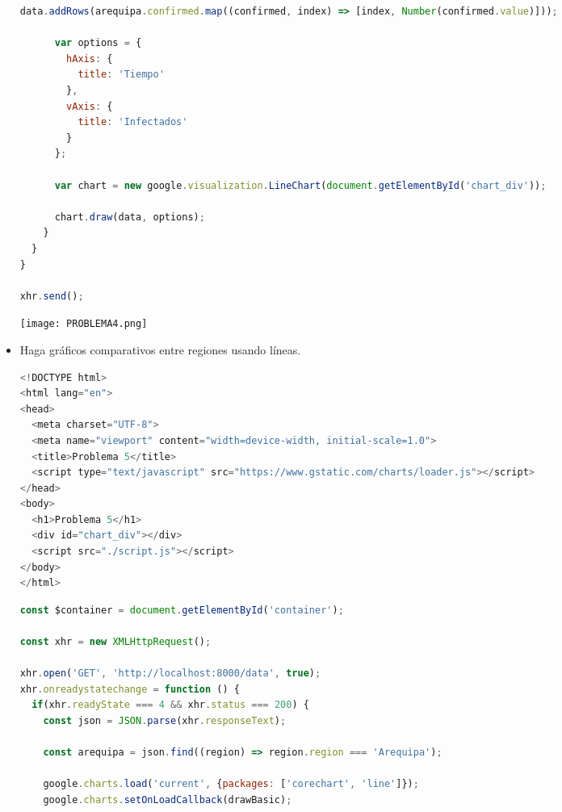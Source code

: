 \documentclass{article}
\begin{document}
\begin{itemize}
\begin{lstlisting}[language=JavaScript, caption=PROBLEMA4-SCRIPT]
      data.addRows(arequipa.confirmed.map((confirmed, index) => [index, Number(confirmed.value)]));

      var options = {
        hAxis: {
          title: 'Tiempo'
        },
        vAxis: {
          title: 'Infectados'
        }
      };

      var chart = new google.visualization.LineChart(document.getElementById('chart_div'));

      chart.draw(data, options);
    }
  }
}

xhr.send();
            \end{lstlisting}  

            \newline \newline \newline
            \texttt{[image: PROBLEMA4.png]}
            \newline \newline \newline

            \item Haga gráficos comparativos entre regiones usando líneas.
            
            \begin{lstlisting}[language=JavaScript, caption=PROBLEMA5-INDEX]
<!DOCTYPE html>
<html lang="en">
<head>
  <meta charset="UTF-8">
  <meta name="viewport" content="width=device-width, initial-scale=1.0">
  <title>Problema 5</title>
  <script type="text/javascript" src="https://www.gstatic.com/charts/loader.js"></script>
</head>
<body>
  <h1>Problema 5</h1>
  <div id="chart_div"></div>
  <script src="./script.js"></script>
</body>
</html>
            \end{lstlisting}  

            \begin{lstlisting}[language=JavaScript, caption=PROBLEMA5-SCRIPT]
const $container = document.getElementById('container');

const xhr = new XMLHttpRequest(); 

xhr.open('GET', 'http://localhost:8000/data', true);
xhr.onreadystatechange = function () {
  if(xhr.readyState === 4 && xhr.status === 200) {
    const json = JSON.parse(xhr.responseText);
    
    const arequipa = json.find((region) => region.region === 'Arequipa');

    google.charts.load('current', {packages: ['corechart', 'line']});
    google.charts.setOnLoadCallback(drawBasic);


\end{lstlisting}
\end{itemize}
\end{document}

